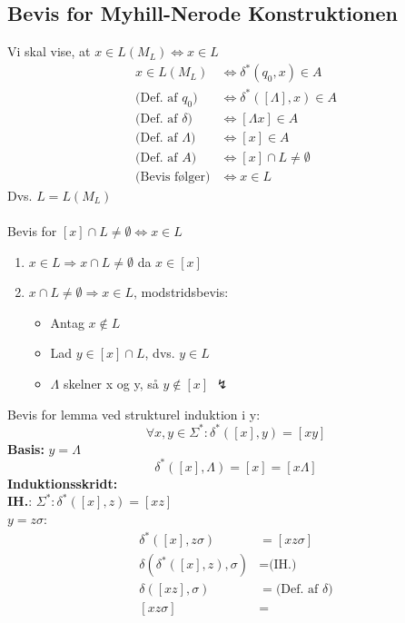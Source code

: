 \documentclass[a4, danish]{article}
\begin{document}
\subsection{Bevis for Myhill-Nerode Konstruktionen}
Vi skal vise, at $x \in L(M_L) \Leftrightarrow x \in L$
\begin{align*}
  x \in L(M_L) &\Leftrightarrow \delta^*(q_0,x) \in A \\
  \text{(Def. af $q_0$)} &\Leftrightarrow \delta^*([\Lambda],x) \in A \\
  \text{(Def. af $\delta$)} &\Leftrightarrow [\Lambda x] \in A \\
  \text{(Def. af $\Lambda$)}  &\Leftrightarrow [x] \in A \\
  \text{(Def. af $A$)} &\Leftrightarrow [x] \cap L \neq \emptyset \\
  \text{(Bevis følger)} &\Leftrightarrow x \in L
\end{align*}
Dvs. $L=L(M_L)$ 
\\ \ \\
Bevis for $[x] \cap L \neq \emptyset \Leftrightarrow x \in L$
\begin{enumerate}
  \item $x \in L \Rightarrow x \cap L \neq \emptyset$ da $x \in [x]$
  \item $x \cap L \neq \emptyset \Rightarrow x \in L $, modstridsbevis:
  \begin{itemize}
    \item Antag $x \notin L$
    \item Lad $y \in [x] \cap L$, dvs. $y \in L$
    \item $\Lambda$ skelner x og y, så $y\notin [x]$ $\lightning$
  \end{itemize}
\end{enumerate}
Bevis for lemma ved strukturel induktion i y: 
\begin{equation*}
  \forall x,y \in \Sigma^*:\delta^*([x],y)=[xy]
\end{equation*}
\textbf{Basis:}
$y=\Lambda$ 
\begin{equation*}
  \delta^*([x],\Lambda) = [x] = [x\Lambda] 
\end{equation*}
\textbf{Induktionsskridt:}\\ 
\textbf{IH.}: $\Sigma^*:\delta^*([x],z)=[xz]$ \\
$y=z\sigma$:
\begin{align*}
  \delta^*([x],z\sigma) &= [xz\sigma] \\
  \delta(\delta^*([x],z),\sigma) &= \text{(IH.)} \\
  \delta([xz],\sigma) &= \text{(Def. af $\delta$)} \\
  [xz\sigma] &=
\end{align*}
\end{document}
